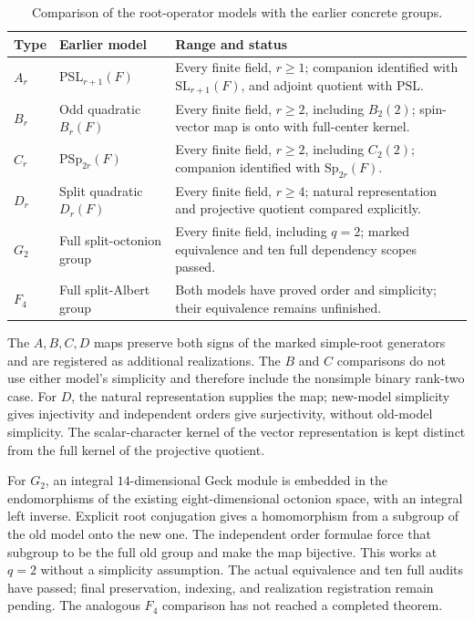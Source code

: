 \documentclass[11pt]{article}
\numberwithin{equation}{section}
\theoremstyle{definition}
\newcommand{\SL}{\mathrm{SL}}
\newcommand{\PSL}{\mathrm{PSL}}
\newcommand{\PSp}{\mathrm{PSp}}
\begin{document}
\begin{table}[!htbp]
\centering\small
\begin{tabularx}{\textwidth}{@{}l l X@{}}
\toprule
Type & Earlier model & Range and status\\
\midrule
$A_r$ & $\PSL_{r+1}(F)$ & Every finite field, $r\geq1$; companion
identified with $\SL_{r+1}(F)$, and adjoint quotient with $\PSL$.\\
$B_r$ & Odd quadratic $B_r(F)$ & Every finite field, $r\geq2$,
including $B_2(2)$; spin-vector map is onto with full-center kernel.\\
$C_r$ & $\PSp_{2r}(F)$ & Every finite field, $r\geq2$,
including $C_2(2)$; companion identified with $\mathrm{Sp}_{2r}(F)$.\\
$D_r$ & Split quadratic $D_r(F)$ & Every finite field, $r\geq4$;
natural representation and projective quotient compared explicitly.\\
$G_2$ & Full split-octonion group & Every finite field, including $q=2$;
marked equivalence and ten full dependency scopes passed.\\
$F_4$ & Full split-Albert group & Both models have proved order and
simplicity; their equivalence remains unfinished.\\
\bottomrule
\end{tabularx}
\caption{Comparison of the root-operator models with the earlier concrete groups.}
\label{tab:chevalley-comparisons}
\end{table}

The $A,B,C,D$ maps preserve both signs of the marked simple-root
generators and are registered as additional realizations. The $B$ and
$C$ comparisons do not use either model's simplicity and therefore
include the nonsimple binary rank-two case. For $D$, the natural
representation supplies the map; new-model simplicity gives injectivity
and independent orders give surjectivity, without old-model simplicity.
The scalar-character kernel of the vector representation is kept
distinct from the full kernel of the projective quotient.

For $G_2$, an integral $14$-dimensional Geck module is embedded in the
endomorphisms of the existing eight-dimensional octonion space, with an
integral left inverse. Explicit root conjugation gives a homomorphism
from a subgroup of the old model onto the new one. The independent
order formulae force that subgroup to be the full old group and make
the map bijective. This works at $q=2$ without a simplicity assumption.
The actual equivalence and ten full audits have passed; final
preservation, indexing, and realization registration remain pending.
The analogous $F_4$ comparison has not reached a completed theorem.
\end{document}
